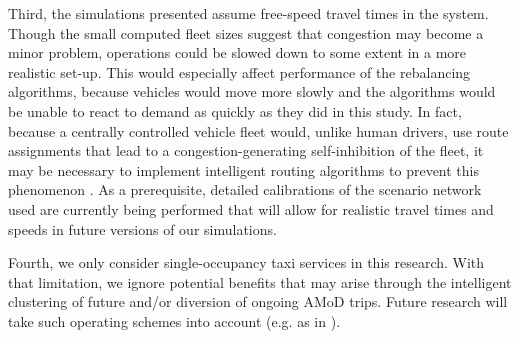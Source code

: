Third, the simulations presented assume free-speed travel times in the system. Though the small computed fleet sizes suggest that congestion may become a minor problem, operations could be slowed down to some extent in a more realistic set-up. This would especially affect performance of the rebalancing algorithms, because vehicles would move more slowly and the algorithms would be unable to react to demand as quickly as they did in this study. In fact, because a centrally controlled vehicle fleet would, unlike human drivers, use  route assignments that lead to a congestion-generating self-inhibition of the fleet, it may be necessary to implement intelligent routing algorithms to prevent this phenomenon \citep[e.g.][]{LEVIN2017229, ZHANG201875}. As a prerequisite, detailed calibrations of the scenario network used are currently being performed that will allow for realistic travel times and speeds in future versions of our simulations.


Fourth, we only consider single-occupancy taxi services in this research. With that limitation, we ignore potential benefits that may arise through the intelligent clustering of future and/or diversion of ongoing AMoD trips. Future research will take such operating schemes into account  (e.g. as in \citet{TELLEZ201899}).